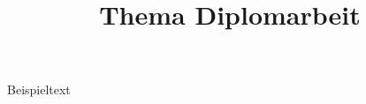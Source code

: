 \documentclass[headsepline,footsepline]{tudscrbook}
\title{Thema Diplomarbeit}
\begin{document}
\maketitle
\begin{tudpage}%
Beispieltext
\end{tudpage}
\Blindtext
\end{document}

